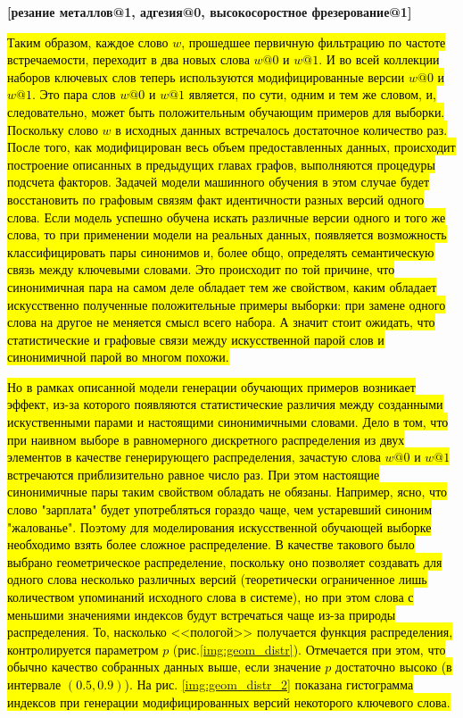 \textbf{[резание металлов@1, адгезия@0, высокосоростное фрезерование@1]}\

\hl{Таким образом, каждое слово $w$, прошедшее первичную фильтрацию по частоте встречаемости, переходит в два новых слова $w@0$ и $w@1$. И во всей коллекции наборов ключевых слов теперь используются модифицированные версии $w@0$ и $w@1$. Это пара слов $w@0$ и $w@1$ является, по сути, одним и тем же словом, и, следовательно, может быть положительным обучающим примеров для выборки. Поскольку слово $w$ в исходных данных встречалось достаточное количество раз. После того, как модифицирован весь объем предоставленных данных, происходит построение описанных в предыдущих главах графов, выполняются процедуры подсчета факторов. Задачей модели машинного обучения в этом случае будет восстановить по графовым связям факт идентичности разных версий одного слова. Если модель успешно обучена искать различные версии одного и того же слова, то при применении модели на реальных данных, появляется возможность классифицировать пары синонимов и, более общо, определять семантическую связь между ключевыми словами.  Это происходит по той причине, что синонимичная пара на самом деле обладает тем же свойством, каким обладает искусственно полученные положительные примеры выборки: при замене одного слова на другое не меняется смысл всего набора. А значит стоит ожидать, что статистические и графовые связи между искусственной парой слов и синонимичной парой во многом похожи.}

\hl{Но в рамках описанной модели генерации обучающих примеров возникает эффект, из-за которого появляются статистические различия между созданными искуственными парами и настоящими синонимичными словами. Дело в том, что при наивном выборе в равномерного дискретного распределения из двух элементов в качестве генерирующего распределения, зачастую слова $w@0$ и $w@1$ встречаются приблизительно равное число раз. При этом настоящие синонимичные пары таким свойством обладать не обязаны. Например, ясно, что слово "зарплата" будет употребляться гораздо чаще, чем устаревший синоним "жалованье". Поэтому для моделирования искусственной обучающей выборке необходимо взять более сложное распределение. В качестве такового было выбрано геометрическое распределение, поскольку оно позволяет создавать для одного слова несколько различных версий (теоретически ограниченное лишь количеством упоминаний исходного слова в системе), но при этом слова с меньшими значениями индексов будут встречаться чаще из-за природы распределения. То, насколько <<пологой>> получается функция распределения, контролируется параметром $p$ (рис.\ref{img:geom_distr}). Отмечается при этом, что обычно качество собранных данных выше, если значение $p$ достаточно высоко (в интервале $(0.5, 0.9)$). На рис. \ref{img:geom_distr_2} показана гистограмма индексов при генерации модифицированных версий некоторого ключевого слова.}

